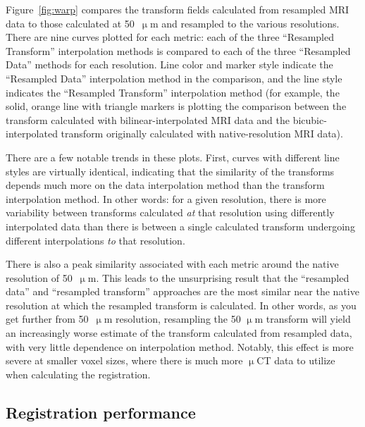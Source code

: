 \documentclass[11pt]{article}
\begin{document}
Figure~\ref{fig:warp} compares the transform fields calculated from resampled
MRI data to those calculated at 50~$\upmu$m and resampled
to the various resolutions. There are nine curves
plotted for each metric: each of the three ``Resampled Transform'' interpolation
methods is compared to each of the three ``Resampled Data'' methods for each
resolution. Line color and marker style indicate the ``Resampled Data''
interpolation method in the comparison, and the line style indicates the
``Resampled Transform'' interpolation method (for example, the solid, orange line with
triangle markers is plotting the comparison between the transform calculated
with bilinear-interpolated MRI data and the bicubic-interpolated transform
originally calculated with native-resolution MRI data).

There are a few notable trends in these plots. First, curves with different line
styles are virtually identical, indicating that the similarity of the transforms
depends much more on the data interpolation method than the transform
interpolation method. In other words: for a given resolution, there is more
variability between transforms calculated \textit{at} that resolution using
differently interpolated data than there is between a single calculated transform
undergoing different interpolations \textit{to} that resolution.

There is also a peak similarity associated with each metric around the native
resolution of 50~$\upmu$m. This leads to the unsurprising result that the
``resampled data'' and ``resampled transform'' approaches are the most similar
near the native resolution at which the resampled transform is calculated. In
other words, as you get further from 50~$\upmu$m resolution, resampling the 50
$\upmu$m transform will yield an increasingly worse estimate of the transform
calculated from resampled data, with very little dependence on interpolation
method. Notably, this effect is more severe at smaller voxel sizes, where there
is much more $\upmu$CT data to utilize when calculating the registration.


\subsection{Registration performance}
\end{document}
